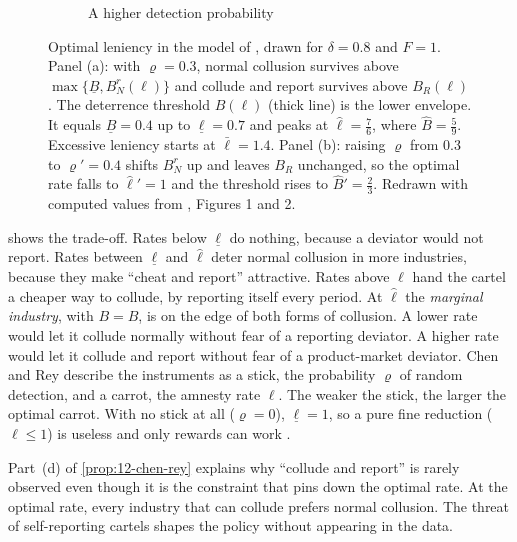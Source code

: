 \begin{figure}[htbp]
\begin{subfigure}[t]{0.49\textwidth}
\caption{A higher detection probability}\label{fig:12-leniency-b}
\end{subfigure}
\caption{Optimal leniency in the model of \citet{ChenRey2013}, drawn for $\delta = 0.8$ and $F = 1$. Panel (a): with
$\varrho = 0.3$, normal collusion survives above $\max\{\underline B, B_N^r(\ell)\}$ and collude and report survives
above $B_R(\ell)$. The deterrence threshold $B(\ell)$ (thick line) is the lower envelope. It equals
$\underline B = 0.4$ up to $\underline\ell = 0.7$ and peaks at $\hat\ell = \frac{7}{6}$, where
$\hat B = \frac{5}{9}$. Excessive leniency starts at $\bar\ell = 1.4$. Panel (b): raising $\varrho$ from 0.3 to
$\varrho' = 0.4$ shifts $B_N^r$ up and leaves $B_R$ unchanged, so the optimal rate falls to $\hat\ell' = 1$ and the
threshold rises to $\hat B' = \frac{2}{3}$. Redrawn with computed values from \citet{ChenRey2013}, Figures 1 and 2.}
\label{fig:12-leniency}
\end{figure}

 shows the trade-off. Rates below $\underline\ell$ do nothing, because a deviator would not
report. Rates between $\underline\ell$ and $\hat\ell$ deter normal collusion in more industries, because they make
``cheat and report'' attractive. Rates above $\hat\ell$ hand the cartel a cheaper way to collude, by reporting itself
every period. At $\hat\ell$ the \emph{marginal industry}, with $B = \hat B$, is on the edge of both forms of
collusion. A lower rate would let it collude normally without fear of a reporting deviator. A higher rate would let it
collude and report without fear of a product-market deviator. Chen and Rey describe the instruments as a stick, the
probability $\varrho$ of random detection, and a carrot, the amnesty rate $\ell$. The weaker the stick, the larger
the optimal carrot. With no stick at all ($\varrho = 0$), $\underline\ell = 1$, so a pure fine reduction ($\ell \le 1$)
is useless and only rewards can work \citep[footnote~13]{ChenRey2013}.

Part~(d) of \cref{prop:12-chen-rey} explains why ``collude and report'' is rarely observed even though it is the
constraint that pins down the optimal rate. At the optimal rate, every industry that can collude prefers normal
collusion. The threat of self-reporting cartels shapes the policy without appearing in the data.

